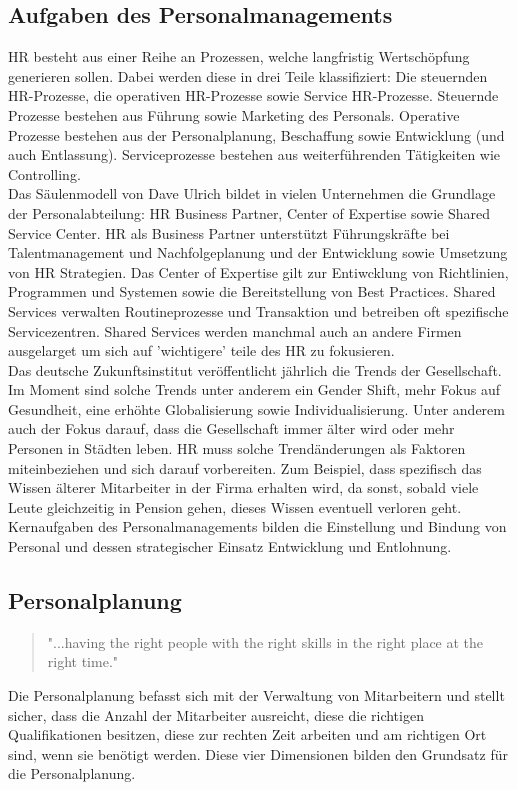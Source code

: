 \documentclass{article}
\begin{document}
	\subsection{Aufgaben des Personalmanagements}
	HR besteht aus einer Reihe an Prozessen, welche langfristig Wertschöpfung generieren sollen. Dabei werden diese in drei Teile klassifiziert: Die steuernden HR-Prozesse, die operativen HR-Prozesse sowie Service HR-Prozesse. Steuernde Prozesse bestehen aus Führung sowie Marketing des Personals. Operative Prozesse bestehen aus der Personalplanung, Beschaffung sowie Entwicklung (und auch Entlassung). Serviceprozesse bestehen aus weiterführenden Tätigkeiten wie Controlling. \\
	Das Säulenmodell von Dave Ulrich bildet in vielen Unternehmen die Grundlage der Personalabteilung: HR Business Partner, Center of Expertise sowie Shared Service Center. HR als Business Partner unterstützt Führungskräfte bei Talentmanagement und Nachfolgeplanung und der Entwicklung sowie Umsetzung von HR Strategien. Das Center of Expertise gilt zur Entiwcklung von Richtlinien, Programmen und Systemen sowie die Bereitstellung von Best Practices. Shared Services verwalten Routineprozesse und Transaktion und betreiben oft spezifische Servicezentren. Shared Services werden manchmal auch an andere Firmen ausgelarget um sich auf 'wichtigere' teile des HR zu fokusieren. \\
	Das deutsche Zukunftsinstitut veröffentlicht jährlich die Trends der Gesellschaft. Im Moment sind solche Trends unter anderem ein Gender Shift, mehr Fokus auf Gesundheit, eine erhöhte Globalisierung sowie Individualisierung. Unter anderem auch der Fokus darauf, dass die Gesellschaft immer älter wird oder mehr Personen in Städten leben. HR muss solche Trendänderungen als Faktoren miteinbeziehen und sich darauf vorbereiten. Zum Beispiel, dass spezifisch das Wissen älterer Mitarbeiter in der Firma erhalten wird, da sonst, sobald viele Leute gleichzeitig in Pension gehen, dieses Wissen eventuell verloren geht. \\
	Kernaufgaben des Personalmanagements bilden die Einstellung und Bindung von Personal und dessen strategischer Einsatz Entwicklung und Entlohnung.
	\subsection{Personalplanung}
	\begin{quote}
	 	"...having the right people with the right skills in the right place at the right time."
	 \end{quote} 
	 Die Personalplanung befasst sich mit der Verwaltung von Mitarbeitern und stellt sicher, dass die Anzahl der Mitarbeiter ausreicht, diese die richtigen Qualifikationen besitzen, diese zur rechten Zeit arbeiten und am richtigen Ort sind, wenn sie benötigt werden. Diese vier Dimensionen bilden den Grundsatz für die Personalplanung.
\end{document}
